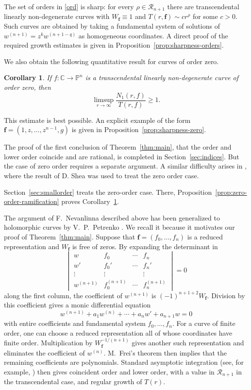 \documentclass[11pt,letterpaper,reqno]{amsart}
\newtheorem{cor}[thm]{Corollary}
\theoremstyle{remark}
\numberwithin{equation}{section}
\newcommand{\C}{\mathbb C}
\newcommand{\PP}{\mathbb P}
\newcommand{\fv}{\bm f}
\begin{document}
The set of orders in \eqref{ord} is sharp: for every
\(\rho\in\mathcal R_{n+1}\) there are transcendental linearly
non-degenerate curves with \(W_{\fv}\equiv1\) and
\(T(r,\fv)\sim c r^\rho\) for some \(c>0\).
Such curves are obtained by taking a fundamental system of solutions of
\(w^{(n+1)}=z^k w^{(n+1-q)}\) as homogeneous coordinates.
A direct proof of the required growth estimates is given in
Proposition~\ref{prop:sharpness-orders}.

We also obtain the following quantitative result for curves of order zero.

\begin{cor}\label{cor:zero-ratio}
If $f:\C\to\PP^{n}$ is a transcendental linearly non-degenerate curve
of order zero, then
\[
 \limsup_{r\to\infty}\frac{N_1(r,f)}{T(r,f)}\geq1.
\]
\end{cor}

This estimate is best possible. An explicit example of the form
$\fv=(1,z,\ldots,z^{n-1},g)$ is given in Proposition~\ref{prop:sharpness-zero}.

The proof of the first conclusion of Theorem~\ref{thm:main},
that the order and lower order coincide and are rational,
is completed in Section~\ref{sec:indices}. But the case of zero order
requires a separate argument. A similar difficulty arises in \cite{Ere93},
where the result of D. Shea \cite{She85} was used to treat the zero order case.

Section~\ref{sec:smallorder} treats the zero-order case.
There, Proposition~\ref{prop:zero-order-ramification} proves
Corollary~\ref{cor:zero-ratio}.

The argument of F.~Nevanlinna described above has been generalized to
holomorphic curves by V.~P.~Petrenko \cite{Pet84}. We recall it because it
motivates our proof of Theorem~\ref{thm:main}. Suppose that
$\fv=(f_0,\ldots,f_n)$ is a reduced representation
and $W_{\fv}$ is free of zeros. By expanding the determinant in
\[
 \begin{vmatrix}
 w&f_0&\cdots&f_n\\
 w'&f_0'&\cdots&f_n'\\
 \vdots&\vdots&&\vdots\\
 w^{(n+1)}&f_0^{(n+1)}&\cdots&f_n^{(n+1)}
 \end{vmatrix}=0
\]
along the first column, the coefficient of $w^{(n+1)}$ is
$(-1)^{{n+1}+2}W_{\fv}$. Division by this coefficient gives a monic differential
equation
\begin{equation}\label{oper}
 w^{(n+1)}+a_1w^{(n)}+\cdots+a_nw'+a_{n+1}w=0
\end{equation}
with entire coefficients and fundamental system $f_0,\ldots,f_n$.
For a curve of finite order, one can choose a reduced representation all of
whose coordinates have finite order. Multiplication by
$W_{\fv}^{-1/(n+1)}$ gives another such representation and eliminates the
coefficient of $w^{(n)}$. M.~Frei's theorem \cite{Fre53} then implies that the
remaining coefficients are polynomials. Standard asymptotic integration (see, for example, \cite{Was65})
then gives coincident order and lower order, with a value in
$\mathcal R_{n+1}$ in the transcendental case, and regular growth of $T(r)$.
\end{document}
